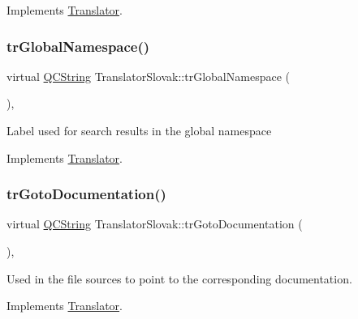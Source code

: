 Implements \mbox{\hyperlink{class_translator}{Translator}}.

\mbox{\label{class_translator_slovak_af8d1573ee123062ff485c58bfe45a482}} 
\subsubsection{\texorpdfstring{trGlobalNamespace()}{trGlobalNamespace()}}
{\footnotesize\ttfamily virtual \mbox{\hyperlink{class_q_c_string}{Q\+C\+String}} Translator\+Slovak\+::tr\+Global\+Namespace (\begin{DoxyParamCaption}{ }\end{DoxyParamCaption})\hspace{0.3cm}{\ttfamily [inline]}, {\ttfamily [virtual]}}

Label used for search results in the global namespace 

Implements \mbox{\hyperlink{class_translator}{Translator}}.

\mbox{\label{class_translator_slovak_a5a607ab07cf82151ae834483695f74d3}} 
\subsubsection{\texorpdfstring{trGotoDocumentation()}{trGotoDocumentation()}}
{\footnotesize\ttfamily virtual \mbox{\hyperlink{class_q_c_string}{Q\+C\+String}} Translator\+Slovak\+::tr\+Goto\+Documentation (\begin{DoxyParamCaption}{ }\end{DoxyParamCaption})\hspace{0.3cm}{\ttfamily [inline]}, {\ttfamily [virtual]}}

Used in the file sources to point to the corresponding documentation. 

Implements \mbox{\hyperlink{class_translator}{Translator}}.

\mbox{\label{class_translator_slovak_ae7f0d052c2b630a98da73c0c9d002f88}} 
